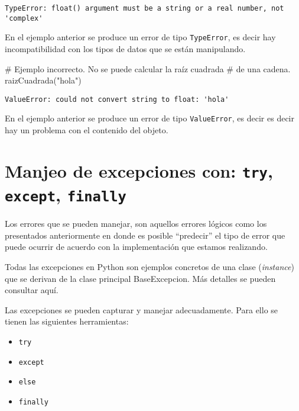 \documentclass[
  letterpaper,
  DIV=11,
  numbers=noendperiod]{scrreprt}
\newenvironment{Shaded}{\begin{snugshade}}{\end{snugshade}}
\newcommand{\CommentTok}[1]{\textcolor[rgb]{0.37,0.37,0.37}{#1}}
\newcommand{\NormalTok}[1]{\textcolor[rgb]{0.00,0.23,0.31}{#1}}
\newcommand{\StringTok}[1]{\textcolor[rgb]{0.13,0.47,0.30}{#1}}
\providecommand{\tightlist}{%
  \setlength{\itemsep}{0pt}\setlength{\parskip}{0pt}}\usepackage{longtable,booktabs,array}
\begin{document}
\begin{verbatim}
TypeError: float() argument must be a string or a real number, not 'complex'
\end{verbatim}

En el ejemplo anterior se produce un error de tipo \texttt{TypeError},
es decir hay incompatibilidad con los tipos de datos que se están
manipulando.

\begin{Shaded}
\begin{Highlighting}[]
\CommentTok{\# Ejemplo incorrecto. No se puede calcular la raíz cuadrada}
\CommentTok{\# de una cadena.}
\NormalTok{raizCuadrada(}\StringTok{"hola"}\NormalTok{)}
\end{Highlighting}
\end{Shaded}

\begin{verbatim}
ValueError: could not convert string to float: 'hola'
\end{verbatim}

En el ejemplo anterior se produce un error de tipo \texttt{ValueError},
es decir es decir hay un problema con el contenido del objeto.


\chapter{\texorpdfstring{Manjeo de excepciones con: \texttt{try},
\texttt{except},
\texttt{finally}}{Manjeo de excepciones con: try, except, finally}}\label{manjeo-de-excepciones-con-try-except-finally}

Los errores que se pueden manejar, son aquellos errores lógicos como los
presentados anteriormente en donde es posible ``predecir'' el tipo de
error que puede ocurrir de acuerdo con la implementación que estamos
realizando.

Todas las excepciones en Python son ejemplos concretos de una clase
(\emph{instance}) que se derivan de la clase principal BaseExcepcion.
Más detalles se pueden consultar aquí.

Las excepciones se pueden capturar y manejar adecuadamente. Para ello se
tienen las siguientes herramientas:

\begin{itemize}
\tightlist
\item
  \texttt{try}
\item
  \texttt{except}
\item
  \texttt{else}
\item
  \texttt{finally}
\end{itemize}
\end{document}
